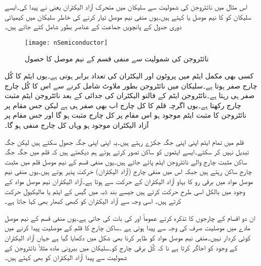 اس مثال میں نائٹروجن کی شمولیت سے سلیکان میں متحرک آزاد الیکٹران یعنی   نے  پیدا کی۔ایسے سلیکان کو  کا نیم موصل یا 
  کہتے ہیں۔یوں منفی نیم موصل تیار کرنے کی خاطر سلیکان میں کیمیائی دوری جدول کے پانچویں جماعت کے عناصر بطور  شامل کئے جاتے ہیں۔
\begin{figure}
\centering
\texttt{[image: nSemiconductor]}
\caption{نائٹروجن کی شمولیت سے منفی قسم کے نیم موصل کا حصول}
\label{شکل_منفی_نیم_موصل_کا_حصول}
\end{figure}
کسی بھی مکمل ایٹم میں پروٹون اور الیکٹران کی تعداد برابر ہوتی ہے۔یوں ایٹم کا کُل چارج صفر ہوتا ہے۔سلیکان میں نائٹروجن بطور ملاوٹ شامل کرنے سے اس کا کُل چارج صفر ہی رہتا ہے۔نائٹروجن ایٹم کے فالتو الیکٹران کی جدائی کے بعد نائٹروجن ایٹم مثبت چارج رکھتا ہے۔یوں اگرچہ قلم کا کل چارج اب بھی صفر ہی ہے لیکن جس مقام پر نائٹروجن کا مثبت ایٹم موجود ہو اس مقام پر کل چارج مثبت ہو گا اور جس مقام پر آزاد الیکٹران موجود ہو وہاں کل چارج منفی ہو گا۔

قلم میں تمام ایٹم اپنی اپنی جگہ جکڑے رہتے ہیں۔یہ اپنی اپنی جگہ جھول سکتے ہیں لیکن جگہ تبدیل نہیں کر سکتے۔ایسے ایٹموں کو ساکن تصور کرتے ہوئے ہم دیکھتے ہیں کہ قلم میں جگہ جگہ ساکن مثبت چارج والے نائٹروجن ایٹم پائے جاتے ہیں۔یوں منفی قسم کے نیم موصل قلم میں مثبت چارج ساکن رہتے ہیں جبکہ اس میں منفی چارج (آزاد الیکٹران) حرکت پذیر ہوتے ہیں۔یوں منفی نیم موصل مواد میں برقی رو کا بہاو آزاد الیکٹران کے حرکت سے ہوتا ہے۔آزاد الیکٹران نیم موصل مواد کے وجود میں بالکل اسی طرح حرکت کرتے ہیں جیسے بند ڈبہ میں گیس کے ایٹم یا مالیکیول حرکت کرتے ہیں۔ اسی وجہ سے آزاد الیکٹران کو کبھی کبھار    بھی کہا جاتا ہے۔

ان دو اقسام کے چارجوں کا تذکرہ کرتے عموماً   اور   کی بات کی جاتی ہے۔یوں منفی قسم کے نیم موصل مادے میں موصلیت صرف  کی وجہ سے پیدا ہوتی ہے ۔ساکن چارج کا قلم کے موصلیت پیدا کرنے  میں کوئی کردار نہیں۔منفی نیم موصل مواد کو ظاہر کرنا بھی شکل  میں دکھایا گیا ہے جہاں  آزاد الیکٹران کے وجود کو اجاگر کرتا ہے نا کہ کُل برقی چارج کو۔سلیکان میں بیرونی مادہ مثلاً نائٹروجن  کے شمولیت سے پیدا آزاد الیکٹران کو   بھی کہتے ہیں۔


